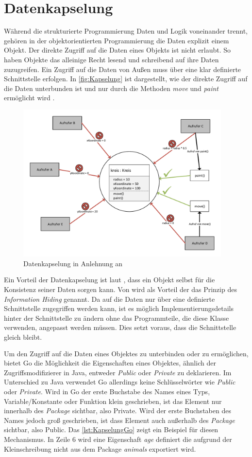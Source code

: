 \section{Datenkapselung}
Während die strukturierte Programmierung Daten und Logik voneinander trennt, gehören in der objektorientierten Programmierung die Daten explizit einem Objekt. 
Der direkte Zugriff auf die Daten eines Objekts ist nicht erlaubt. 
So haben Objekte das alleinige Recht lesend und schreibend auf ihre Daten zuzugreifen. 
Ein Zugriff auf die Daten von Außen muss über eine klar definierte Schnittstelle erfolgen.
In \autoref{fig:Kapselung} ist dargestellt, wie der direkte Zugriff auf die Daten unterbunden ist und nur durch die Methoden \emph{move} und \emph{paint} ermöglicht wird \cite[]{Lahres.2011}.

\begin{figure}[H]
    \centering
    \includegraphics[height=8cm]{Images/Kapselung.pdf}
    \caption{Datenkapselung in Anlehnung an \cite[]{Lahres.2011}}
    \label{fig:Kapselung}
\end{figure}

Ein Vorteil der Datenkapselung ist laut \cite[]{Lahres.2011}, dass ein Objekt selbst für die Konsistenz seiner Daten sorgen kann. 
Von \cite[S.86f]{PoetzschHeffter.2009} wird als Vorteil der das Prinzip des \emph{Information Hiding} genannt. 
Da auf die Daten nur über eine definierte Schnittstelle zugegriffen werden kann, ist es möglich Implementierungsdetails hinter der Schnittstelle zu ändern ohne das Programmteile, die diese Klasse verwenden, angepasst werden müssen. 
Dies setzt voraus, dass die Schnittstelle gleich bleibt.

Um den Zugriff auf die Daten eines Objektes zu unterbinden oder zu ermöglichen, bietet Go die Möglichkeit die Eigenschaften eines Objektes, ähnlich der Zugriffsmodifizierer in Java, entweder \emph{Public} oder \emph{Private} zu deklarieren. 
Im Unterschied zu Java verwendet Go allerdings keine Schlüsselwörter wie \emph{Public} oder \emph{Private}.
Wird in Go der erste Buchstabe des Names eines Typs, Variable/Konstante oder Funktion klein geschrieben, ist das Element nur innerhalb des \emph{Package} sichtbar, also Private. 
Wird der erste Buchstaben des Names jedoch groß geschrieben, ist dass Element auch außerhalb des \emph{Package} sichtbar, also Public.
Das \autoref{lst:KapselungGo} zeigt ein Beispiel für diesen Mechanismus. 
In Zeile 6 wird eine Eigenschaft \emph{age} definiert die aufgrund der Kleinschreibung nicht aus dem Package \emph{animals} exportiert wird. 

